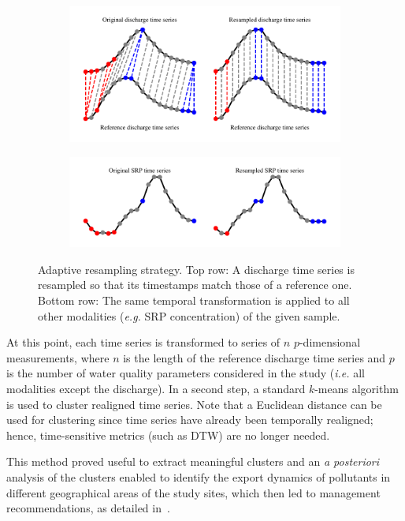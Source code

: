 \begin{figure}[t]
    \begin{subfigure}[b]{\textwidth}
         \centering
         \includegraphics[width=.7\textwidth]{fig/dtw_da}
     \end{subfigure}
      \begin{subfigure}[b]{\textwidth}
           \centering
           \includegraphics[width=.7\textwidth]{fig/dtw_da_b}
       \end{subfigure}
    \caption{Adaptive resampling strategy. Top row: A discharge time series is
    resampled so that its timestamps match those of a reference one. Bottom row:
    The same temporal transformation is applied to all other modalities
    (\emph{e.g.} SRP concentration) of the given sample.}
    \label{fig:dtw_da}
\end{figure}

At this point, each time series is transformed to series of $n$
$p$-dimensional measurements, where $n$ is the length of the
reference discharge time series and $p$ is the number of water quality
parameters considered in the study (\emph{i.e.} all modalities except the
discharge).
In a second step, a standard $k$-means algorithm is used to cluster
realigned time series.
Note that a Euclidean distance can be used for clustering since time series
have already been temporally realigned; hence, time-sensitive metrics (such as
DTW) are no longer needed.

This method proved useful to extract meaningful clusters and an \emph{a posteriori}
analysis of the clusters enabled to identify the export dynamics of pollutants
in different geographical areas of the study sites, which then led to management
recommendations, as detailed in~\cite{dupas:halshs-01228397}.
